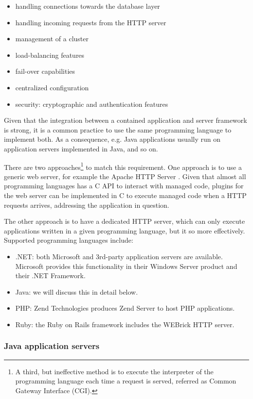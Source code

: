\begin{itemize}
\item handling connections towards the database layer
\item handling incoming requests from the HTTP server
\item management of a cluster
\item load-balancing features
\item fail-over capabilities
\item centralized configuration
\item security: cryptographic and authentication features
\end{itemize}

Given that the integration between a contained application and server framework
is strong, it is a common practice to use the same programming language to
implement both. As a consequence, e.g. Java applications usually run on
application servers implemented in Java, and so on.

There are two approaches\footnote{A third, but ineffective method is to
execute the interpreter of the programming language each time a request is
served, referred as Common Gateway Interface (CGI).} to match this requirement.
One approach is to use a generic web server, for example the Apache HTTP
Server \cite{apache-httpd}. Given that almost all programming languages has a C
API to interact with managed code, plugins for the web server can be
implemented in C to execute managed code when a HTTP requests arrives,
addressing the application in question.

The other approach is to have a dedicated HTTP server, which can only execute
applications written in a given programming language, but it so more
effectively. Supported programming languages include:

\begin{itemize}
\item .NET: both Microsoft and 3rd-party application servers are available.
Microsoft provides this functionality in their Windows Server product and their
.NET Framework.
\item Java: we will discuss this in detail below.
\item PHP: Zend Technologies produces Zend Server to host PHP applications.
\item Ruby: the Ruby on Rails framework includes the WEBrick HTTP server.
\end{itemize}

\subsubsection*{Java application servers}

